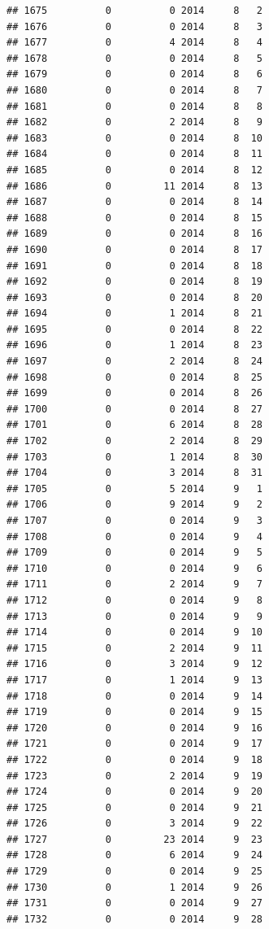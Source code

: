 \documentclass[
]{article}
\begin{document}
\begin{verbatim}
## 1675          0          0 2014     8   2
## 1676          0          0 2014     8   3
## 1677          0          4 2014     8   4
## 1678          0          0 2014     8   5
## 1679          0          0 2014     8   6
## 1680          0          0 2014     8   7
## 1681          0          0 2014     8   8
## 1682          0          2 2014     8   9
## 1683          0          0 2014     8  10
## 1684          0          0 2014     8  11
## 1685          0          0 2014     8  12
## 1686          0         11 2014     8  13
## 1687          0          0 2014     8  14
## 1688          0          0 2014     8  15
## 1689          0          0 2014     8  16
## 1690          0          0 2014     8  17
## 1691          0          0 2014     8  18
## 1692          0          0 2014     8  19
## 1693          0          0 2014     8  20
## 1694          0          1 2014     8  21
## 1695          0          0 2014     8  22
## 1696          0          1 2014     8  23
## 1697          0          2 2014     8  24
## 1698          0          0 2014     8  25
## 1699          0          0 2014     8  26
## 1700          0          0 2014     8  27
## 1701          0          6 2014     8  28
## 1702          0          2 2014     8  29
## 1703          0          1 2014     8  30
## 1704          0          3 2014     8  31
## 1705          0          5 2014     9   1
## 1706          0          9 2014     9   2
## 1707          0          0 2014     9   3
## 1708          0          0 2014     9   4
## 1709          0          0 2014     9   5
## 1710          0          0 2014     9   6
## 1711          0          2 2014     9   7
## 1712          0          0 2014     9   8
## 1713          0          0 2014     9   9
## 1714          0          0 2014     9  10
## 1715          0          2 2014     9  11
## 1716          0          3 2014     9  12
## 1717          0          1 2014     9  13
## 1718          0          0 2014     9  14
## 1719          0          0 2014     9  15
## 1720          0          0 2014     9  16
## 1721          0          0 2014     9  17
## 1722          0          0 2014     9  18
## 1723          0          2 2014     9  19
## 1724          0          0 2014     9  20
## 1725          0          0 2014     9  21
## 1726          0          3 2014     9  22
## 1727          0         23 2014     9  23
## 1728          0          6 2014     9  24
## 1729          0          0 2014     9  25
## 1730          0          1 2014     9  26
## 1731          0          0 2014     9  27
## 1732          0          0 2014     9  28

\end{verbatim}
\end{document}
